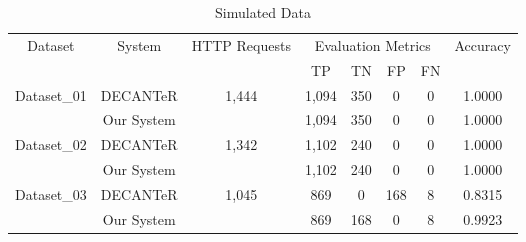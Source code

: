 \begin{table*}[!h]
\centering
\caption{Simulated Data}
\label{tbl:db_03}
\begin{tabular}{|c|c|c|c|c|c|c|c|}
\hline\hline
\multirow{2}{*}{Dataset}     & \multirow{2}{*}{System} & \multirow{2}{*}{HTTP Requests} & \multicolumn{4}{c|}{Evaluation Metrics} & \multirow{2}{*}{Accuracy} \\ \cline{4-7}
                             &                         &                                & TP       & TN       & FP       & FN     &                           \\ \hline
\multirow{2}{*}{Dataset\_01} & DECANTeR \cite{bortolameotti2017decanter}                & \multirow{2}{*}{1,444}          & 1,094      & 350      & 0       & 0      & 1.0000                     \\ \cline{2-2} \cline{4-8} 
                             & Our System              &                                & 1,094      & 350      & 0       & 0      & 1.0000                    \\ \hline
\multirow{2}{*}{Dataset\_02} & DECANTeR \cite{bortolameotti2017decanter}                & \multirow{2}{*}{1,342}          & 1,102      & 240      & 0       & 0      & 1.0000                     \\ \cline{2-2} \cline{4-8} 
                             & Our System              &                                & 1,102      & 240      & 0       & 0      & 1.0000                     \\ \hline
\multirow{2}{*}{Dataset\_03} & DECANTeR \cite{bortolameotti2017decanter}                & \multirow{2}{*}{1,045}          & 869      & 0        & 168      & 8      & 0.8315                    \\ \cline{2-2} \cline{4-8} 
                             & Our System              &                                & 869      & 168      & 0        & 8      & 0.9923                    \\ \hline\hline
\end{tabular}
\end{table*}




